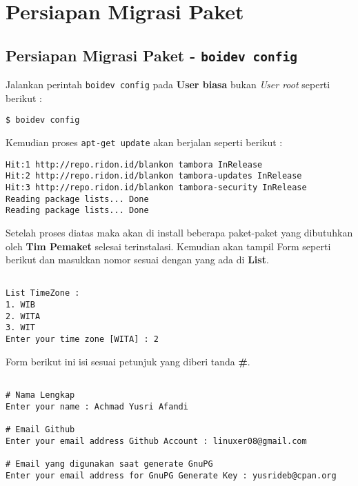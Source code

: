 {\section{Persiapan Migrasi Paket}
\subsection{Persiapan Migrasi Paket - \texttt{boidev config}}
\label{implm_1}
\noindent
Jalankan perintah \texttt{boidev config} pada \textbf{User biasa} bukan \textit{User root} seperti berikut :

\begin{lstlisting}[language=ShellBash]
$ boidev config
\end{lstlisting}

\noindent
Kemudian proses \texttt{apt-get update} akan berjalan seperti berikut :

\begin{lstlisting}[language=ShellBash]
Hit:1 http://repo.ridon.id/blankon tambora InRelease
Hit:2 http://repo.ridon.id/blankon tambora-updates InRelease
Hit:3 http://repo.ridon.id/blankon tambora-security InRelease
Reading package lists... Done                      
Reading package lists... Done

\end{lstlisting}

\noindent
Setelah proses diatas maka akan di install beberapa paket-paket yang dibutuhkan oleh \textbf{Tim Pemaket} selesai terinstalasi. Kemudian akan tampil Form seperti berikut dan masukkan nomor sesuai dengan yang ada di \textbf{List}.

\begin{lstlisting}[language=ShellBash]

List TimeZone : 
1. WIB 
2. WITA 
3. WIT 
Enter your time zone [WITA] : 2

\end{lstlisting}

\noindent
Form berikut ini isi sesuai petunjuk yang diberi tanda \textbf{\#}.

\begin{lstlisting}[language=ShellBash]

# Nama Lengkap
Enter your name : Achmad Yusri Afandi

# Email Github
Enter your email address Github Account : linuxer08@gmail.com

# Email yang digunakan saat generate GnuPG
Enter your email address for GnuPG Generate Key : yusrideb@cpan.org



\end{lstlisting}}

